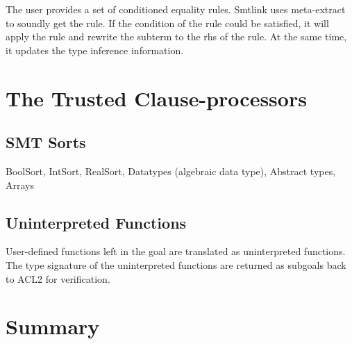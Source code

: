 The user provides a set of conditioned equality rules. Smtlink uses meta-extract
to soundly get the rule. If the condition of the rule could be satisfied, it
will apply the rule and rewrite the subterm to the rhs of the rule. At the same
time, it updates the type inference information.


\section{The Trusted Clause-processors}
\label{sec:tcp}

\subsection{SMT Sorts}
BoolSort, IntSort, RealSort, Datatypes (algebraic data type), Abstract types, Arrays



\subsection{Uninterpreted Functions}
User-defined functions left in the goal are translated as uninterpreted
functions. The type signature of the uninterpreted functions are returned as
subgoals back to ACL2 for verification.

\section{Summary}
\label{sec:summary}


